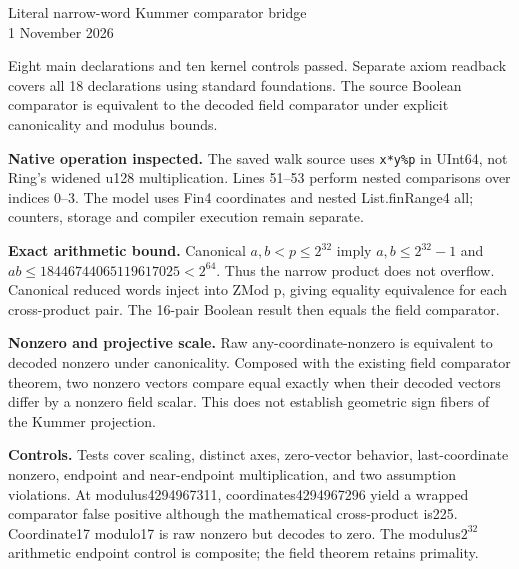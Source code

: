 \documentclass[11pt]{article}\usepackage[margin=0.8in]{geometry}\usepackage[T1]{fontenc}\usepackage{lmodern,tikz,hyperref}\setlength{\parindent}{0pt}\setlength{\parskip}{8pt}\sloppy
\begin{document}
\begin{center}{\Large Literal narrow-word Kummer comparator bridge}\\1 November 2026\end{center}
Eight main declarations and ten kernel controls passed. Separate axiom readback covers all 18 declarations using standard foundations. The source Boolean comparator is equivalent to the decoded field comparator under explicit canonicality and modulus bounds.
\begin{center}\end{center}
\textbf{Native operation inspected.} The saved walk source uses \texttt{x*y\%p} in UInt64, not Ring's widened u128 multiplication. Lines 51--53 perform nested comparisons over indices 0--3. The model uses Fin4 coordinates and nested List.finRange4 all; counters, storage and compiler execution remain separate.

\textbf{Exact arithmetic bound.} Canonical $a,b<p\le2^{32}$ imply $a,b\le2^{32}-1$ and $ab\le18446744065119617025<2^{64}$. Thus the narrow product does not overflow. Canonical reduced words inject into ZMod p, giving equality equivalence for each cross-product pair. The 16-pair Boolean result then equals the field comparator.

\textbf{Nonzero and projective scale.} Raw any-coordinate-nonzero is equivalent to decoded nonzero under canonicality. Composed with the existing field comparator theorem, two nonzero vectors compare equal exactly when their decoded vectors differ by a nonzero field scalar. This does not establish geometric sign fibers of the Kummer projection.

\textbf{Controls.} Tests cover scaling, distinct axes, zero-vector behavior, last-coordinate nonzero, endpoint and near-endpoint multiplication, and two assumption violations. At modulus4294967311, coordinates4294967296 yield a wrapped comparator false positive although the mathematical cross-product is225. Coordinate17 modulo17 is raw nonzero but decodes to zero. The modulus$2^{32}$ arithmetic endpoint control is composite; the field theorem retains primality.
\end{document}
